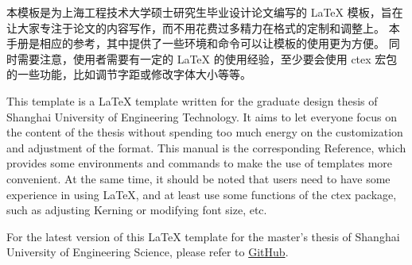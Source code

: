 \begin{ChineseAbstract}
    本模板是为上海工程技术大学硕士研究生毕业设计论文编写的 \LaTeX{} 模板，旨在让大家专注于论文的内容写作，而不用花费过多精力在格式的定制和调整上。
    本手册是相应的参考，其中提供了一些环境和命令可以让模板的使用更为方便。
    同时需要注意，使用者需要有一定的 \LaTeX{} 的使用经验，至少要会使用 ctex 宏包的一些功能，比如调节字距或修改字体大小等等。

    \vspace{0.4\textheight}

\end{ChineseAbstract}

\begin{EnglishAbstract}
    This template is a \LaTeX{} template written for the graduate design thesis of Shanghai University of Engineering Technology.
    It aims to let everyone focus on the content of the thesis without spending too much energy on the customization and adjustment of the format.
    This manual is the corresponding Reference, which provides some environments and commands to make the use of templates more convenient.
    At the same time, it should be noted that users need to have some experience in using \LaTeX{}, and at least use some functions of the ctex package, such as adjusting Kerning or modifying font size, etc.

    For the latest version of this \LaTeX{} template for the master's thesis of Shanghai University of Engineering Science, please refer to \href{https://github.com/zhh2001/sues-thesis}{GitHub}.

    \vspace{0.4\textheight}

\end{EnglishAbstract}


